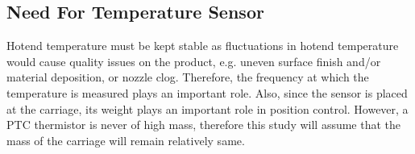 \subsection{Need For Temperature Sensor}

Hotend temperature must be kept stable as fluctuations in hotend temperature would cause quality issues on the product, e.g. uneven surface finish and/or material deposition, or nozzle clog. Therefore, the frequency at which the temperature is measured plays an important role. Also, since the sensor is placed at the carriage, its weight plays an important role in position control. However, a PTC thermistor is never of high mass, therefore this study will assume that the mass of the carriage will remain relatively same.

